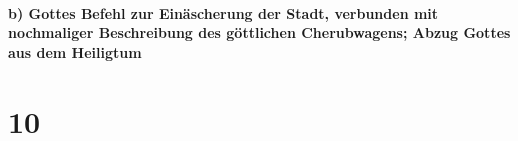 \hypertarget{b-gottes-befehl-zur-einuxe4scherung-der-stadt-verbunden-mit-nochmaliger-beschreibung-des-guxf6ttlichen-cherubwagens-abzug-gottes-aus-dem-heiligtum}{%
\paragraph{b) Gottes Befehl zur Einäscherung der Stadt, verbunden mit
nochmaliger Beschreibung des göttlichen Cherubwagens; Abzug Gottes aus
dem
Heiligtum}\label{b-gottes-befehl-zur-einuxe4scherung-der-stadt-verbunden-mit-nochmaliger-beschreibung-des-guxf6ttlichen-cherubwagens-abzug-gottes-aus-dem-heiligtum}}

\hypertarget{section-9}{%
\section{10}\label{section-9}}

